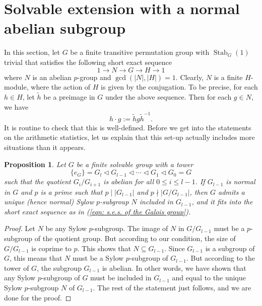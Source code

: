 \documentclass[12pt,a4paper]{amsart}
\numberwithin{equation}{section}%
\theoremstyle{plain}%
\newtheorem{proposition}[theorem]{Proposition}%
\theoremstyle{definition}%
\theoremstyle{remark}%
\begin{document}
    \section{Solvable extension with a normal abelian subgroup}\label{section: Solvable extension with a normal abelian subgroup}
    In this section, let $G$ be a finite transitive permutation group with $\operatorname{Stab}_{G}(1)$ trivial that satisfies the following short exact sequence
    \begin{equation}\label{eqn: s.e.s. of the Galois group}
    	1\to N\to G\to H\to1
    \end{equation}
    where $N$ is an abelian $p$-group and $\gcd(\lvert N\rvert,\lvert H\rvert)=1$.
    Clearly, $N$ is a finite $H$-module, where the action of $H$ is given by the conjugation.
    To be precise, for each $h\in H$, let $\tilde{h}$ be a preimage in $G$ under the above sequence.
    Then for each $g\in N$, we have
    \begin{equation*}
    	h\cdot g:=\tilde{h}g\tilde{h}^{-1}.
    \end{equation*}
    It is routine to check that this is well-defined.
    Before we get into the statements on the arithmetic statistics, let us explain that this set-up actually includes more situations than it appears.
    \begin{proposition}\label{prop: solvable extension with a normal abelian subgroup}
    	Let $G$ be a finite solvable group with a tower
    	\begin{equation*}
    		\{e_{G}\}=G_{l}\triangleleft G_{l-1}\triangleleft\cdots\triangleleft G_{1}\triangleleft G_{0}=G
    	\end{equation*}
    	such that the quotient $G_{i}/G_{i+1}$ is abelian for all $0\leq i\leq l-1$.
    	If $G_{l-1}$ is normal in $G$ and $p$ is a prime such that $p\mid\lvert G_{l-1}\rvert$ and $p\nmid\lvert G/G_{l-1}\rvert$, then $G$ admits a unique (hence normal) Sylow $p$-subgroup $N$ included in $G_{l-1}$, and it fits into the short exact sequence as in (\ref{eqn: s.e.s. of the Galois group}).
    \end{proposition}
    \begin{proof}
    	Let $N$ be any Sylow $p$-subgroup.
    	The image of $N$ in $G/G_{l-1}$ must be a $p$-subgroup of the quotient group.
    	But according to our condition, the size of $G/G_{l-1}$ is coprime to $p$.
    	This shows that $N\subseteq G_{l-1}$.
    	Since $G_{l-1}$ is a subgroup of $G$, this means that $N$ must be a Sylow $p$-subgroup of $G_{l-1}$.
    	But according to the tower of $G$, the subgroup $G_{l-1}$ is abelian.
    	In other words, we have shown that any Sylow $p$-subgroup of $G$ must be included in $G_{l-1}$ and equal to the unique Sylow $p$-subgroup $N$ of $G_{l-1}$.
    	The rest of the statement just follows, and we are done for the proof.
    \end{proof}
\end{document}
